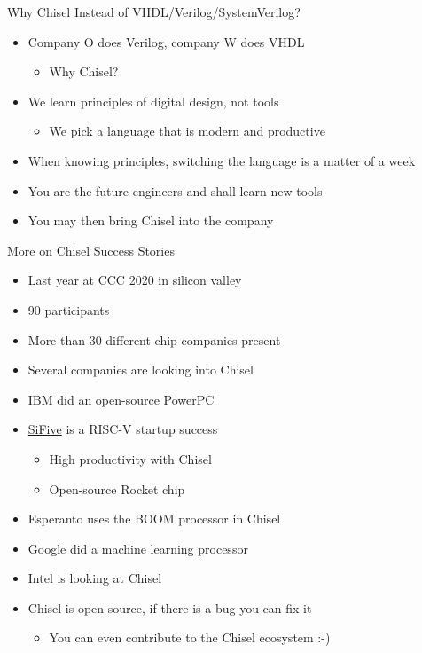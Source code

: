 \begin{frame}[fragile]{Why Chisel Instead of VHDL/Verilog/SystemVerilog?}
\begin{itemize}
\item Company O does Verilog, company W does VHDL
\begin{itemize}
\item Why Chisel?
\end{itemize}
\item We learn principles of digital design, not tools
\begin{itemize}
\item We pick a language that is modern and productive
\end{itemize}
\item When knowing principles, switching the language is a matter of a week
\item You are the future engineers and shall learn new tools
\item You may then bring Chisel into the company
\end{itemize}
\end{frame}

\begin{frame}[fragile]{More on Chisel Success Stories}
\begin{itemize}
\item Last year at CCC 2020 in silicon valley
\item 90 participants
\item More than 30 different chip companies present
\item Several companies are looking into Chisel
\item IBM did an open-source PowerPC
\item \href{https://www.sifive.com/}{SiFive} is a RISC-V startup success
\begin{itemize}
\item High productivity with Chisel
\item Open-source Rocket chip
\end{itemize}
\item Esperanto uses the BOOM processor in Chisel
\item Google did a machine learning processor
\item Intel is looking at Chisel
\item Chisel is open-source, if there is a bug you can fix it
\begin{itemize}
\item You can even contribute to the Chisel ecosystem :-)
\end{itemize}
\end{itemize}
\end{frame}

